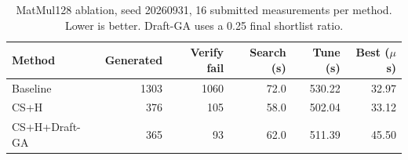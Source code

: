 \begin{table}[t]
\centering
\small
\caption{MatMul128 ablation, seed 20260931, 16 submitted measurements per method. Lower is better. Draft-GA uses a 0.25 final shortlist ratio.}
\label{tab:seed31-ablation-20261010}
\begin{tabular}{lrrrrr}
\toprule
Method & Generated & Verify fail & Search (s) & Tune (s) & Best ($\mu$s) \\
\midrule
Baseline & 1303 & 1060 & 72.0 & 530.22 & 32.97 \\
CS+H & 376 & 105 & 58.0 & 502.04 & 33.12 \\
CS+H+Draft-GA & 365 & 93 & 62.0 & 511.39 & 45.50 \\
\bottomrule
\end{tabular}
\end{table}
